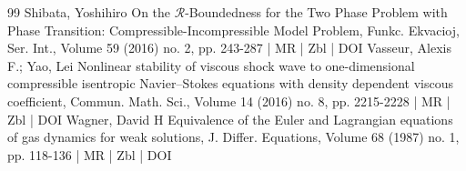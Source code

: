 \documentclass[10pt]{amsart}
\theoremstyle{definition}\newtheorem{defi}[theo]{Definition}\newtheorem{rema}[theo]{Remark}\newtheorem{exam}[theo]{Example}\newtheorem{exem}[theo]{Example}\newtheorem{nota}[theo]{Notation}
\begin{document}
\begin{thebibliography}{99}
 Shibata, Yoshihiro On the $\mathcal{R}$-Boundedness for the Two Phase Problem with Phase Transition: Compressible-Incompressible Model Problem, Funkc. Ekvacioj, Ser. Int., Volume 59 (2016) no. 2, pp. 243-287 | MR | Zbl | DOI
 Vasseur, Alexis F.; Yao, Lei Nonlinear stability of viscous shock wave to one-dimensional compressible isentropic Navier–Stokes equations with density dependent viscous coefficient, Commun. Math. Sci., Volume 14 (2016) no. 8, pp. 2215-2228 | MR | Zbl | DOI
 Wagner, David H Equivalence of the Euler and Lagrangian equations of gas dynamics for weak solutions, J. Differ. Equations, Volume 68 (1987) no. 1, pp. 118-136 | MR | Zbl | DOI
\end{thebibliography}
\end{document}
